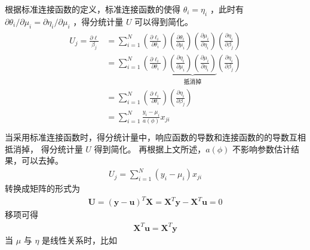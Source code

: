 \documentclass[letterpaper,10pt,english]{sphinxmanual}
\begin{document}
根据标准连接函数的定义，标准连接函数的使得 \(\theta_i=\eta_i\)
，此时有 \(\partial \theta_i / \partial \mu_i = \partial \eta_i / \partial \mu_i\)
，得分统计量 \(U\) 可以得到简化。
\begin{align}\label{equation:广义线性模型/estimate:广义线性模型/estimate:16}\!\begin{aligned}
U_j = \frac{ \partial \ell}{\beta_j} &= \sum_{i=1}^N
\left ( \frac{\partial \ell_i}{\partial \theta_i} \right )
\left ( \frac{\partial \theta_i}{\partial \mu_i} \right )
\left ( \frac{\partial \mu_i}{\partial \eta_i} \right )
\left ( \frac{\partial \eta_i}{\partial \beta_j} \right )\\
&= \sum_{i=1}^N
\left ( \frac{\partial \ell_i}{\partial \theta_i} \right )
\underbrace{
\left ( \frac{\partial \eta_i}{\partial \mu_i} \right )
\left ( \frac{\partial \mu_i}{\partial \eta_i} \right )
}_{\text{抵消掉}}
\left ( \frac{\partial \eta_i}{\partial \beta_j} \right )\\
&= \sum_{i=1}^N
\left ( \frac{\partial \ell_i}{\partial \theta_i} \right )
\left ( \frac{\partial \eta_i}{\partial \beta_j} \right )\\
&= \sum_{i=1}^N \frac{y_i-\mu_i}{a(\phi)} x_{ji}\\
\end{aligned}\end{align}
当采用标准连接函数时，得分统计量中，响应函数的导数和连接函数的的导数互相抵消掉，
得分统计量 \(U\) 得到简化。
再根据上文所述，\(a(\phi)\) 不影响参数估计结果，可以去掉。
\begin{equation}\label{equation:广义线性模型/estimate:广义线性模型/estimate:17}
\begin{split}U_j =  \sum_{i=1}^N  (y_i-\mu_i) x_{ji}\end{split}
\end{equation}
转换成矩阵的形式为
\begin{equation}\label{equation:广义线性模型/estimate:广义线性模型/estimate:18}
\begin{split}\pmb{U} = (\pmb{y}-\pmb{u})^T \pmb{X}
= \pmb{X}^T \pmb{y} - \pmb{X}^T \pmb{u}
= 0\end{split}
\end{equation}
移项可得
\begin{equation}\label{equation:广义线性模型/estimate:eq_glm_estimate_150}
\begin{split}\pmb{X}^T \pmb{u} = \pmb{X}^T  \pmb{y}\end{split}
\end{equation}
当 \(\mu\) 与 \(\eta\) 是线性关系时，比如
\end{document}
